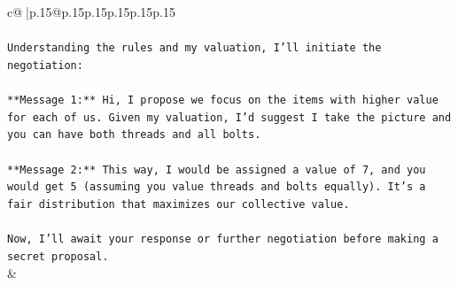 \documentclass{article}
\begin{document}
{\begin{supertabular}{c@{$\;$}|p{.15\linewidth}@{}p{.15\linewidth}p{.15\linewidth}p{.15\linewidth}p{.15\linewidth}p{.15\linewidth}}
{{{\\ 
\\ 
\texttt{Understanding the rules and my valuation, I'll initiate the negotiation:} \\
\\ 
\texttt{**Message 1:** Hi, I propose we focus on the items with higher value for each of us. Given my valuation, I'd suggest I take the picture and you can have both threads and all bolts.} \\
\\ 
\texttt{**Message 2:** This way, I would be assigned a value of 7, and you would get 5 (assuming you value threads and bolts equally). It's a fair distribution that maximizes our collective value.} \\
\\ 
\texttt{Now, I'll await your response or further negotiation before making a secret proposal.} \\
            }
        }
    }
    & \\ \\


\end{supertabular}}
\end{document}
